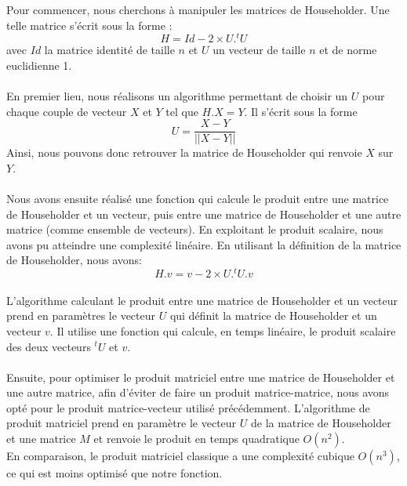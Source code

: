 \documentclass{article}
\begin{document}
Pour commencer, nous cherchons à manipuler les matrices de Householder. Une telle matrice s'écrit sous la forme :
\begin{equation}
    \displaystyle{H = Id - 2 \times U.^tU}
\end{equation}
avec $Id$ la matrice identité de taille $n$ et $U$ un vecteur de taille $n$ et de norme euclidienne 1.

\paragraph{}
En premier lieu, nous réalisons un algorithme permettant de choisir un $U$ pour chaque couple de vecteur $X$ et $Y$ tel que $H.X = Y$. Il s'écrit sous la forme
\begin{equation}
    U=\frac{X-Y}{||X-Y||}
\end{equation}
Ainsi, nous pouvons donc retrouver la matrice de Householder qui renvoie $X$ sur $Y$.

\paragraph{}
Nous avons ensuite réalisé une fonction qui calcule le produit entre une matrice de Householder et un vecteur, puis entre une matrice de Householder et une autre matrice (comme ensemble de vecteurs). En exploitant le produit scalaire, nous avons pu atteindre une complexité linéaire.
En utilisant la définition de la matrice de Householder, nous avons: 
\begin{equation}
    \displaystyle{H.v = v - 2 \times U.^tU.v}
\end{equation}

\paragraph{}
L'algorithme calculant le produit entre une matrice de Householder et un vecteur prend en paramètres le vecteur $U$ qui définit la matrice de Householder et un vecteur $v$. Il utilise une fonction qui calcule, en temps linéaire, le produit scalaire des deux vecteurs $^{t}U$ et $v$.

\paragraph{}
Ensuite, pour optimiser le produit matriciel entre une matrice de Householder et une autre matrice, afin d'éviter de faire un produit matrice-matrice, nous avons opté pour le produit matrice-vecteur utilisé précédemment. L'algorithme de produit matriciel prend en paramètre le vecteur $U$ de la matrice de Householder et une matrice $M$ et renvoie le produit en temps quadratique $O(n^2)$. \\[0.2cm]
En comparaison, le produit matriciel classique a une complexité cubique $O(n^3)$, ce qui est moins optimisé que notre fonction.
 
\end{document}
